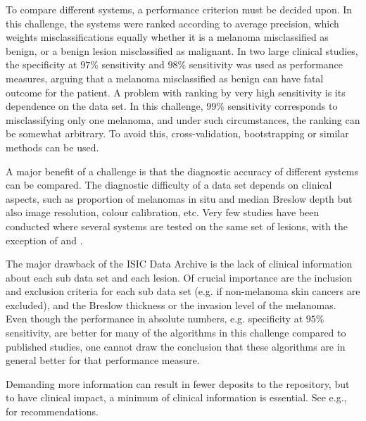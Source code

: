 \documentclass[a4paper,12pt]{article}
\begin{document}
To compare different systems, a performance criterion must be decided upon. In this challenge, the systems were ranked according to average precision, which weights misclassifications equally whether it is a melanoma misclassified as benign, or a benign lesion misclassified as malignant. In two large clinical studies, the specificity at $97\%$ sensitivity \citep{Malvehy2014Clinical} and $98\%$ sensitivity \citep{Monheit2011Performance} was used as performance measures, arguing that a melanoma misclassified as benign can have fatal outcome for the patient. A problem with ranking by very high sensitivity is its dependence on the data set. In this challenge, $99\%$ sensitivity corresponds to misclassifying only one melanoma, and under such circumstances, the ranking can be somewhat arbitrary. To avoid this, cross-validation, bootstrapping or similar methods can be used.   

A major benefit of a challenge is that the diagnostic accuracy of different systems can be compared. The diagnostic difficulty of a data set depends on clinical aspects, such as proportion of melanomas in situ and median Breslow depth but also image resolution, colour calibration, etc. Very few studies have been conducted where several systems are tested on the same set of lesions, with the exception of \cite{Perrinaud2007Can} and \cite{Mollersen2015Computeraided}. 

The major drawback of the ISIC Data Archive is the lack of clinical information about each sub data set and each lesion. Of crucial importance are the inclusion and exclusion criteria for each sub data set (e.g. if non-melanoma skin cancers are excluded), and the Breslow thickness or the invasion level of the melanomas. 
Even though the performance in absolute numbers, e.g. specificity at $95\%$ sensitivity, are better for many of the algorithms in this challenge compared to published studies, one cannot draw the conclusion that these algorithms are in general better for that performance measure. 

Demanding more information can result in fewer deposits to the repository, but to have clinical impact, a minimum of clinical information is essential. See e.g., \citep{Malvehy2007Dermoscopy} for recommendations. 

%
\end{document}
